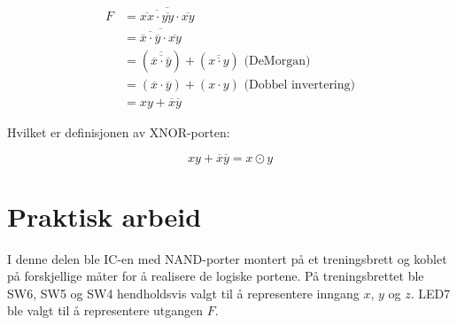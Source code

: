 \documentclass[11pt,a4paper,twocolumn]{article}
\begin{document}
$$
\begin{aligned}
F &= \overline{\overline{\overline{xx} \cdot \overline{yy}} \cdot \overline{xy}} \\
&= \overline{\overline{\overline{x} \cdot \overline{y}} \cdot \overline{xy}} \\
&= (\overline{\overline{\overline{x} \cdot \overline{y}}}) + (\overline{\overline{x \cdot y}}) \text{ (DeMorgan)} \\
&= (\overline{x} \cdot \overline{y}) + (x \cdot y) \text{ (Dobbel invertering)} \\
&= xy + \overline{x}\overline{y}
\end{aligned}
$$

Hvilket er definisjonen av XNOR-porten:

$$
xy + \overline{x}\overline{y} = x \odot y
$$

\section{Praktisk arbeid}
I denne delen ble IC-en med NAND-porter montert på et treningsbrett og koblet på forskjellige måter for å realisere de logiske portene. På treningsbrettet ble SW6, SW5 og SW4 hendholdsvis valgt til å representere inngang $x$, $y$ og $z$. LED7 ble valgt til å representere utgangen $F$.
\end{document}
